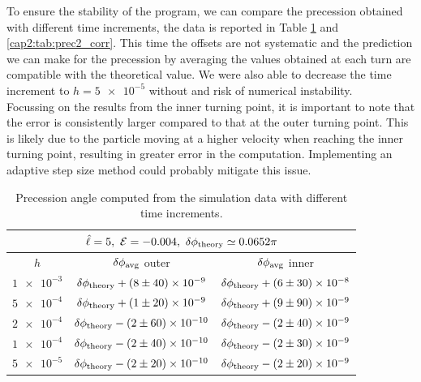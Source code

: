 To ensure the stability of the program, we can compare the precession obtained
with different time increments, the data is reported in Table
\ref{cap2:tab:prec1_corr} and \ref{cap2:tab:prec2_corr}.
This time the offsets are not systematic and the prediction we can make for
the precession by averaging the values obtained at each turn are compatible with
the theoretical value.
We were also able to decrease the time increment to $h = \num{5e-5}$ without
and risk of numerical instability. \\
Focussing on the results from the inner turning point, it is important to note
that the error is consistently larger compared to that at the outer turning
point.
This is likely due to the particle moving at a higher velocity when reaching the
inner turning point, resulting in greater error in the computation.
Implementing an adaptive step size method could probably mitigate this issue.

\begin{table}[h]
    \centering
    \begin{tabular}{|c|c|c|}
        \hline
        \multicolumn{3}{|c|}{$\hat \ell = 5, ~ \mathcal E = -0.004,
        ~ \delta \phi_{\rm theory} \simeq 0.0652 \pi$} \\
        \hline
        $h$ & $\delta \phi_{\rm avg}$ outer & $\delta \phi_{\rm avg}$ inner \\
        \hline
        $\num{1e-3}$ & $\delta \phi_{\rm theory} + (8 \pm 40) \times \num{e-9}$
        & $\delta \phi_{\rm theory} + (6 \pm 30) \times \num{e-8}$ \\
        \hline
        $\num{5e-4}$ & $\delta \phi_{\rm theory} + (1 \pm 20) \times \num{e-9}$
        & $\delta \phi_{\rm theory} + (9 \pm 90) \times \num{e-9}$ \\
        \hline
        $\num{2e-4}$ & $\delta \phi_{\rm theory} - (2 \pm 60) \times \num{e-10}$
        & $\delta \phi_{\rm theory} - (2 \pm 40) \times \num{e-9}$ \\
        \hline
        $\num{1e-4}$ & $\delta \phi_{\rm theory} - (2 \pm 40) \times \num{e-10}$
        & $\delta \phi_{\rm theory} - (2 \pm 30) \times \num{e-9}$ \\
        \hline
        $\num{5e-5}$ & $\delta \phi_{\rm theory} - (2 \pm 20) \times \num{e-10}$
        & $\delta \phi_{\rm theory} - (2 \pm 20) \times \num{e-9}$ \\
        \hline
    \end{tabular}
    \caption{Precession angle computed from the simulation data with different
    time increments.}
    \label{cap2:tab:prec1_corr}
\end{table}

